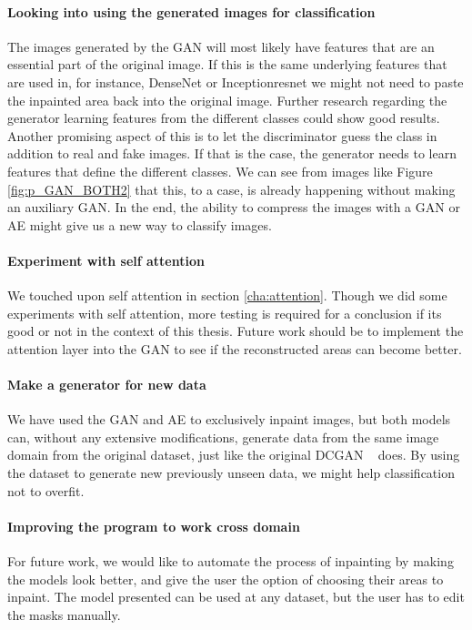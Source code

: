 \paragraph{Looking into using the generated images for classification}
The images generated by the GAN will most likely have features that are an essential part of the original image. If this is the same underlying features that are used in, for instance, DenseNet or Inceptionresnet we might not need to paste the inpainted area back into the original image.
Further research regarding the generator learning features from the different classes could show good results.
Another promising aspect of this is to let the discriminator guess the class in addition to real and fake images. If that is the case, the generator needs to learn features that define the different classes. We can see from images like Figure \ref{fig:p_GAN_BOTH2} that this, to a case, is already happening without making an auxiliary GAN.
In the end, the ability to compress the images with a GAN or AE might give us a new way to classify images.

\paragraph{Experiment with self attention}
We touched upon self attention in section \ref{cha:attention}. Though we did some experiments with self attention, more testing is required for a conclusion if its good or not in the context of this thesis. Future work should be to implement the attention layer into the GAN to see if the reconstructed areas can become better. 


\paragraph{Make a generator for new data}
We have used the GAN and AE to exclusively inpaint images, but both models can, without any extensive modifications,  generate data from the same image domain from the original dataset, just like the original DCGAN ~\cite{DBLP:journals/corr/RadfordMC15} does.  
By using the dataset to generate new previously unseen data, we might help classification not to overfit.

\paragraph{Improving the program to work cross domain}
For future work, we would like to automate the process of inpainting by making the models look better, and give the user the option of choosing their areas to inpaint. The model presented can be used at any dataset, but the user has to edit the masks manually. 


